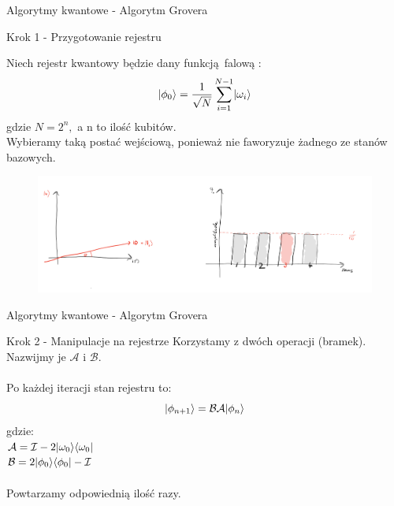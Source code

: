 \documentclass{beamer}
\DeclarePairedDelimiter\bra{\langle}{\rvert}
\DeclarePairedDelimiter\ket{\lvert}{\rangle}
\begin{document}
	\begin{frame}{Algorytmy kwantowe - Algorytm Grovera}
		\begin{block}{Krok 1 - Przygotowanie rejestru}

			Niech rejestr kwantowy będzie dany funkcją falową : 
			$$\ket{\phi_{0}} = \frac{1}{\sqrt{N}}\sum\limits_{i=1}^{N-1}\ket{\omega_{i}} $$
			gdzie $N = 2^{n},$ a n to ilość kubitów.\\ \vspace{0.4em}
			Wybieramy taką postać wejściową, ponieważ nie faworyzuje żadnego ze stanów bazowych. 
		\end{block}
		\begin{center}
			\begin{figure}
				\includegraphics[scale=0.5]{media/groverINIT.png}
			\end{figure}
		\end{center}
	\end{frame}
	
	
	
	\begin{frame}{Algorytmy kwantowe - Algorytm Grovera}
		\begin{block}{Krok 2 - Manipulacje na rejestrze}
			\vspace{0.5em}
			Korzystamy z dwóch operacji (bramek). Nazwijmy je $\mathcal{A}$ i $\mathcal{B}$.\\~\\
			Po każdej iteracji stan rejestru to:
			$$\ket{\phi_{n+1}} =\mathcal{B}\mathcal{A}\ket{\phi_{n}}$$
			\quad gdzie:\\
			\centering
			$\mathcal{A} = \mathcal{I} - 2\ket{\omega_{0}}\bra{\omega_{0}}$\vspace{0.5em}\\
			$\mathcal{B} = 2\ket{\phi_{0}}\bra{\phi_{0}} - \mathcal{I} $\\~\\
			Powtarzamy odpowiednią ilość razy.
			
			\vspace{0.5em}
		\end{block}
	\end{frame}
	
\end{document}
